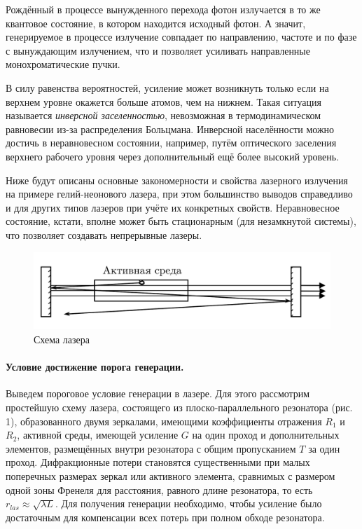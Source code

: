 \documentclass[a4paper,12pt]{article}
\theoremstyle{definition}
\begin{document}
\par Рождённый в процессе вынужденного перехода фотон излучается в то же квантовое состояние, 
в котором находится исходный фотон. А значит, генерируемое в процессе излучение совпадает по
направлению, частоте и по фазе с вынуждающим излучением, что и позволяет усиливать направленные 
монохроматические пучки. 

\par В силу равенства вероятностей, усиление может возникнуть только если на верхнем уровне 
окажется больше атомов, чем на нижнем. Такая ситуация называется \textit{инверсной заселенностью},
невозможная в термодинамическом равновесии из-за распределения Больцмана. Инверсной населённости 
можно достичь в неравновесном состоянии, например, путём оптического заселения верхнего рабочего 
уровня через дополнительный ещё более высокий уровень. 

\par Ниже будут описаны основные закономерности и свойства лазерного излучения на 
примере гелий-неонового лазера, при этом большинство выводов справедливо и для других типов 
лазеров при учёте их конкретных свойств. Неравновесное состояние, кстати, вполне может быть 
стационарным (для незамкнутой системы), что позволяет создавать непрерывные лазеры.

\begin{figure}[H]
	\centering
	\includegraphics[scale=0.25]{laser1.png}
	\caption{Схема лазера} \label{scheme_laser}
\end{figure}

\paragraph{Условие достижение порога генерации.} Выведем пороговое условие генерации в лазере. 
Для этого рассмотрим простейшую схему лазера, состоящего из плоско-параллельного резонатора (рис. 1),
образованного двумя зеркалами, имеющими коэффициенты отражения $R_1$ и $R_2$, активной среды, 
имеющей усиление $G$ на один проход и дополнительных элементов, размещённых внутри резонатора с 
общим пропусканием $T$ за один проход. Дифракционные потери становятся существенными при малых 
поперечных размерах зеркал или активного элемента, сравнимых с размером одной зоны Френеля для 
расстояния, равного длине резонатора, то есть $r_{las} \approx \sqrt{\lambda L}$. Для получения 
генерации необходимо, чтобы усиление было достаточным для компенсации всех потерь при полном обходе 
резонатора.
\end{document}
